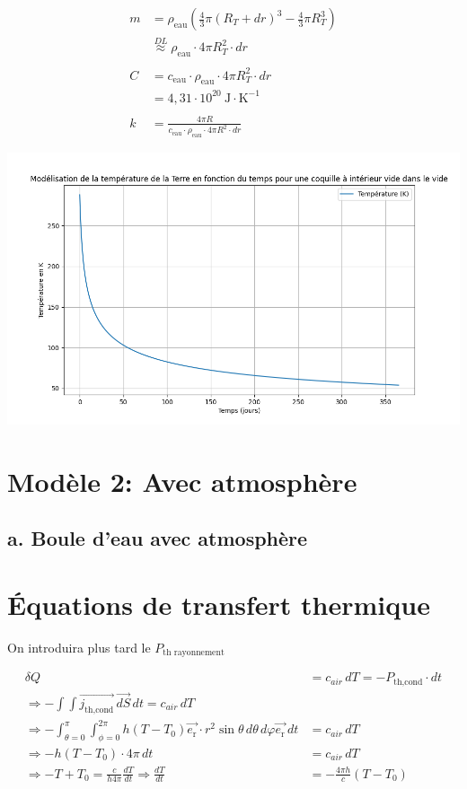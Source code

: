 \documentclass[a4paper,12pt]{article}
\begin{document}
\begin{align*}
m &= \rho_{\text{eau}} \left( \frac{4}{3} \pi (R_T + dr)^3 - \frac{4}{3} \pi R_T^3 \right) \\
&\overset{DL}{\approx} \rho_{\text{eau}} \cdot 4\pi R_T^2 \cdot dr \\
\\
C &= c_{\text{eau}} \cdot \rho_{\text{eau}} \cdot 4\pi R_T^2 \cdot dr \\
&= 4{,}31 \cdot 10^{20} \ \text{J} \cdot \text{K}^{-1} \\
\\
k &= \frac{4\pi R}{c_{\text{eau}} \cdot \rho_{\text{eau}} \cdot 4\pi R^2 \cdot dr}
\end{align*}

    \includegraphics[width=0.8\linewidth]{../modele1/figures/modele1_coquille.png} 


\section{Modèle 2: Avec atmosphère}
\subsection{a. Boule d'eau avec atmosphère }
\section*{Équations de transfert thermique}

On introduira plus tard le \(P_{\text{th rayonnement}}\)

\begin{align*}
\delta Q &= c_{air}\, dT = -P_{\text{th,cond}} \cdot dt \\
\Rightarrow -\int \int \vec{j_{\text{th,cond}}}\, \vec{dS}\,dt = c_{air}\, dT \\
\Rightarrow -\int_{\theta=0}^\pi \int_{\phi=0}^{2\pi} h(T - T_0) \vec{e_{\text{r}}}\cdot r^2 \sin\theta\, d\theta\, d\varphi \vec{e_{\text{r}}}\, dt &=  c_{air}\, dT  \\
\Rightarrow -h(T - T_0) \cdot 4\pi\, dt &= c_{air}\, dT \\
\Rightarrow -T + T_0 = \frac{c}{h 4\pi} \frac{dT}{dt} \Rightarrow \frac{dT}{dt} &= -\frac{4\pi h}{c}(T - T_0)
\end{align*}
\end{document}
